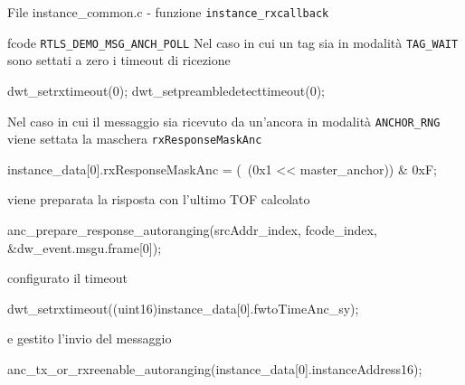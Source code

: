 \begin{frame}[fragile, shrink=30]{File instance\_common.c - funzione \lstinline[language=C]!instance_rxcallback!}
  \begin{block}{fcode \lstinline[language=C]!RTLS_DEMO_MSG_ANCH_POLL!}
    Nel caso in cui un tag sia in modalità \lstinline[language=C]!TAG_WAIT! sono settati a zero i timeout di ricezione
    \begin{C}
      dwt_setrxtimeout(0);
      dwt_setpreambledetecttimeout(0);
    \end{C}
    Nel caso in cui il messaggio sia ricevuto da un'ancora in modalità \lstinline[language=C]!ANCHOR_RNG! viene settata la maschera
    \lstinline[language=C]!rxResponseMaskAnc!
    \begin{C}
      instance_data[0].rxResponseMaskAnc = (~(0x1 << master_anchor)) & 0xF;    
    \end{C}
    viene preparata la risposta con l'ultimo TOF calcolato
    \begin{C}
      anc_prepare_response_autoranging(srcAddr_index, fcode_index, &dw_event.msgu.frame[0]);
    \end{C}
    configurato il timeout 
    \begin{C}
      dwt_setrxtimeout((uint16)instance_data[0].fwtoTimeAnc_sy);
    \end{C}
    e gestito l'invio del messaggio
    \begin{C}
      anc_tx_or_rxreenable_autoranging(instance_data[0].instanceAddress16);
    \end{C}
  \end{block}
\end{frame}

